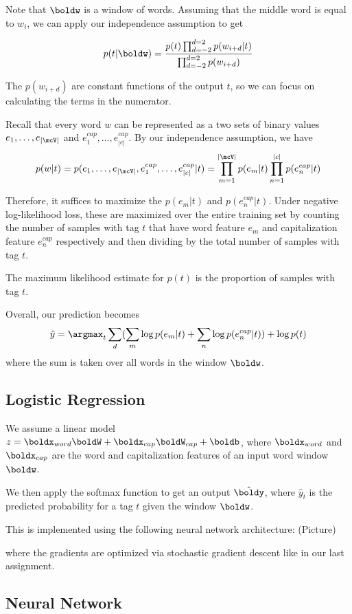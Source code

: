 \documentclass[11pt]{article}
\begin{document}
Note that $\boldw$ is a window of words. Assuming that the middle word is equal to $w_i$, we can apply our independence assumption to get 

$$p(t | \boldw) = \frac{p(t)\prod_{d=-2}^{d=2} p(w_{i+d} | t)}{\prod_{d=-2}^{d=2} p(w_{i+d})}$$

The $p(w_{i+d})$ are constant functions of the output $t$, so we can focus on calculating the terms in the numerator. 

Recall that every word $w$ can be represented as a two sets of binary values $e_1, \dots, e_{|\mcV|}$ and $e^{cap}_1, \dots, e^{cap}_{|c|}$. By our independence assumption, we have 
$$p(w | t) = p(e_1, \dots, e_{|\mcV|}, e^{cap}_1, \dots, e^{cap}_{|c|} | t) = \prod_{m=1}^{|\mcV|} p(e_m | t) \prod_{n=1}^{|c|} p(e^{cap}_n | t)$$

Therefore, it suffices to maximize the $p(e_m | t)$ and $p(e^{cap}_n | t)$. Under negative log-likelihood loss, these are maximized over the entire training set by counting the number of samples with tag $t$ that have word feature $e_m$ and capitalization feature $e^{cap}_n$ respectively and then dividing by the total number of samples with tag $t$. 

The maximum likelihood estimate for $p(t)$ is the proportion of samples with tag $t$. 

Overall, our prediction becomes
$$\hat{y} = \argmax_t \sum_d (\sum_m \log p(e_m | t) + \sum_n \log p(e^{cap}_n | t)) + \log p(t)$$
where the sum is taken over all words in the window $\boldw$. 

\subsection{Logistic Regression}

We assume a linear model $z = \boldx_{word} \boldW + \boldx_{cap} \boldW_{cap} + \boldb$, where $\boldx_{word}$ and $\boldx_{cap}$ are the word and capitalization features of an input word window $\boldw$. 

We then apply the softmax function to get an output $\hat{\boldy}$, where $\hat{y}_t$ is the predicted probability for a tag $t$ given the window $\boldw$. 

This is implemented using the following neural network architecture:
(Picture)

where the gradients are optimized via stochastic gradient descent like in our last assignment. 

\subsection{Neural Network}
\end{document}
